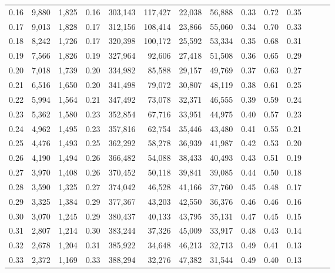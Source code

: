 \begin{tabular}{rrrrrrrrrrrrrr}
0.16 &   9,880 &  1,825 &  0.16 &  303,143 &  117,427 &  22,038 &  56,888 &  0.33 &  0.72 &      0.35 \\
0.17 &   9,013 &  1,828 &  0.17 &  312,156 &  108,414 &  23,866 &  55,060 &  0.34 &  0.70 &      0.33 \\
0.18 &   8,242 &  1,726 &  0.17 &  320,398 &  100,172 &  25,592 &  53,334 &  0.35 &  0.68 &      0.31 \\
0.19 &   7,566 &  1,826 &  0.19 &  327,964 &   92,606 &  27,418 &  51,508 &  0.36 &  0.65 &      0.29 \\
0.20 &   7,018 &  1,739 &  0.20 &  334,982 &   85,588 &  29,157 &  49,769 &  0.37 &  0.63 &      0.27 \\
0.21 &   6,516 &  1,650 &  0.20 &  341,498 &   79,072 &  30,807 &  48,119 &  0.38 &  0.61 &      0.25 \\
0.22 &   5,994 &  1,564 &  0.21 &  347,492 &   73,078 &  32,371 &  46,555 &  0.39 &  0.59 &      0.24 \\
0.23 &   5,362 &  1,580 &  0.23 &  352,854 &   67,716 &  33,951 &  44,975 &  0.40 &  0.57 &      0.23 \\
0.24 &   4,962 &  1,495 &  0.23 &  357,816 &   62,754 &  35,446 &  43,480 &  0.41 &  0.55 &      0.21 \\
0.25 &   4,476 &  1,493 &  0.25 &  362,292 &   58,278 &  36,939 &  41,987 &  0.42 &  0.53 &      0.20 \\
0.26 &   4,190 &  1,494 &  0.26 &  366,482 &   54,088 &  38,433 &  40,493 &  0.43 &  0.51 &      0.19 \\
0.27 &   3,970 &  1,408 &  0.26 &  370,452 &   50,118 &  39,841 &  39,085 &  0.44 &  0.50 &      0.18 \\
0.28 &   3,590 &  1,325 &  0.27 &  374,042 &   46,528 &  41,166 &  37,760 &  0.45 &  0.48 &      0.17 \\
0.29 &   3,325 &  1,384 &  0.29 &  377,367 &   43,203 &  42,550 &  36,376 &  0.46 &  0.46 &      0.16 \\
0.30 &   3,070 &  1,245 &  0.29 &  380,437 &   40,133 &  43,795 &  35,131 &  0.47 &  0.45 &      0.15 \\
0.31 &   2,807 &  1,214 &  0.30 &  383,244 &   37,326 &  45,009 &  33,917 &  0.48 &  0.43 &      0.14 \\
0.32 &   2,678 &  1,204 &  0.31 &  385,922 &   34,648 &  46,213 &  32,713 &  0.49 &  0.41 &      0.13 \\
0.33 &   2,372 &  1,169 &  0.33 &  388,294 &   32,276 &  47,382 &  31,544 &  0.49 &  0.40 &      0.13 \\

\end{tabular}
